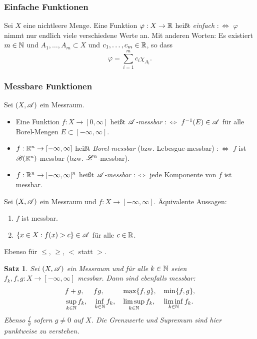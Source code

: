 \documentclass[
 a4paper,
 12pt,
 parskip=half
 ]{scrartcl}
\theoremstyle{plain}
\newtheorem*{thm*}{Satz}
\theoremstyle{definition}
\numberwithin{equation}{section}
\begin{document}
\subsubsection{Einfache Funktionen}
Sei $X$ eine nichtleere Menge. Eine Funktion $\varphi: X \to \mathbb{R}$ heißt \emph{einfach} $:\Leftrightarrow$ $\varphi$ nimmt nur endlich viele verschiedene Werte an. Mit anderen Worten: Es existiert $m \in \mathbb{N}$ und $A_1, \ldots, A_m \subset X$ und $c_1, \ldots, c_m \in \mathbb{R}$, so dass
\[ \varphi = \sum_{i=1}^m c_i \chi_{A_i}. \]

\subsubsection{Messbare Funktionen}
Sei $(X, \mathscr{A})$ ein Messraum.
\begin{itemize}
 \item Eine Funktion $f: X \to [0, \infty]$ heißt \emph{$\mathscr{A}$-messbar} $:\Leftrightarrow$ $f^{-1}(E) \in \mathscr{A}$ für alle Borel-Mengen $E \subset [-\infty,\infty]$.
 \item $f: \mathbb{R}^n \to [-\infty,\infty]$ heißt \emph{Borel-messbar} (bzw. Lebesgue-messbar) $:\Leftrightarrow$ $f$ ist $\mathscr{B}(\mathbb{R}^n)$-messbar (bzw. $\mathscr{L}^n$-messbar).
 \item $f: \mathbb{R}^n \to [-\infty,\infty]^n$ heißt \emph{$\mathscr{A}$-messbar} $:\Leftrightarrow$ jede Komponente von $f$ ist messbar.
\end{itemize}

\begin{bem}
 Sei $(X, \mathscr{A})$ ein Messraum und $f: X \to [-\infty,\infty]$. Äquivalente Aussagen:
 \begin{enumerate}
  \item $f$ ist messbar.
  \item $\{ x \in X: f(x) > c \} \in \mathscr{A}$ für alle $c \in \mathbb{R}$.
 \end{enumerate}
 Ebenso für $\le$, $\ge$, $<$ statt $>$.
\end{bem}

\begin{thm*}
 Sei $(X, \mathscr{A})$ ein Messraum und für alle $k \in \mathbb{N}$ seien $f_k, f, g: X \to [-\infty,\infty]$ messbar. Dann sind ebenfalls messbar:
 \begin{align*}
 &f+g,& &fg,& &\max\{ f, g \},& &\min\{ f, g \}, \\ 
 &\sup_{k \in \mathbb{N}} f_k, & &\inf_{k \in \mathbb{N}} f_k,& &\limsup_{k \in \mathbb{N}} f_k,& &\liminf_{k \in \mathbb{N}} f_k.
 \end{align*}
 Ebenso $\frac{f}{g}$ sofern $g \ne 0$ auf $X$. Die Grenzwerte und Supremum sind hier \emph{punktweise} zu verstehen.
\end{thm*}
\end{document}
